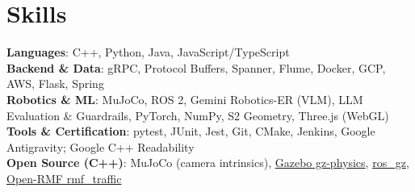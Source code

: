 \documentclass[letterpaper,11pt]{article}
\begin{document}
\section{Skills}
 \begin{itemize}[leftmargin=0.15in, label={}]
    \small{\item{
     \textbf{Languages}: C++, Python, Java, JavaScript/TypeScript \\
     \textbf{Backend \& Data}: gRPC, Protocol Buffers, Spanner, Flume, Docker, GCP, AWS, Flask, Spring \\
     \textbf{Robotics \& ML}: MuJoCo, ROS 2, Gemini Robotics-ER (VLM), LLM Evaluation \& Guardrails, PyTorch, NumPy, S2 Geometry, Three.js (WebGL) \\
     \textbf{Tools \& Certification}: pytest, JUnit, Jest, Git, CMake, Jenkins, Google Antigravity; Google C++ Readability \\
     \textbf{Open Source (C++)}: MuJoCo (camera intrinsics), \href{https://github.com/gazebosim/gz-physics/pulls?q=author:alanwanga}{Gazebo gz-physics}, \href{https://github.com/gazebosim/ros_gz/pulls?q=author:alanwanga}{ros\_gz}, \href{https://github.com/open-rmf/rmf_traffic/pulls?q=author:alanwanga}{Open-RMF rmf\_traffic}
    }}
 \end{itemize}
\end{document}
